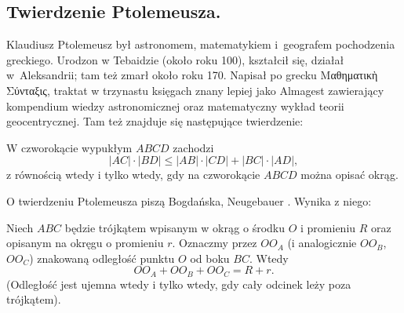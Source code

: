 \subsection{Twierdzenie Ptolemeusza.}
Klaudiusz Ptolemeusz był astronomem, matematykiem i~geografem pochodzenia greckiego.
Urodzon w Tebaidzie (około roku 100), kształcił się, działał w~Aleksandrii; tam też zmarł około roku 170.
Napisał po grecku Μαθηματικὴ Σύνταξις, traktat w trzynastu księgach znany lepiej jako Almagest zawierający kompendium wiedzy astronomicznej oraz matematyczny wykład teorii geocentrycznej.
Tam też znajduje się następujące twierdzenie:

\begin{theorem}[Ptolemeusza, 140]
    W czworokącie wypukłym $ABCD$ zachodzi
    \begin{equation}
        |AC| \cdot |BD| \le |AB| \cdot |CD| + |BC| \cdot |AD|,
    \end{equation}
    z równością wtedy i tylko wtedy, gdy na czworokącie $ABCD$ można opisać okrąg.
\end{theorem}

O twierdzeniu Ptolemeusza piszą Bogdańska, Neugebauer \cite[s. 62, 63]{neugebauer_2018}.
Wynika z niego:

\begin{theorem}[Carnot, 1???]
    Niech $ABC$ będzie trójkątem wpisanym w okrąg o środku $O$ i promieniu $R$ oraz opisanym na okręgu o promieniu $r$.
    Oznaczmy przez $OO_A$ (i analogicznie $OO_B$, $OO_C$) znakowaną odległość punktu $O$ od boku $BC$.
    Wtedy 
    \begin{equation}
        OO_A + OO_B + OO_C = R + r.
    \end{equation}
    (Odległość jest ujemna wtedy i tylko wtedy, gdy cały odcinek leży poza trójkątem).
\end{theorem}